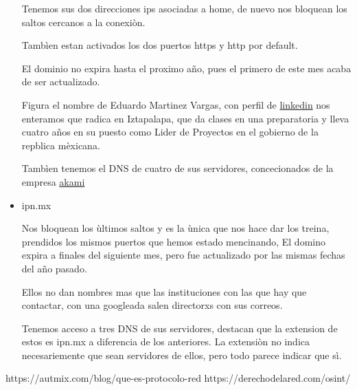 \documentclass{article}
\begin{document}
\begin{itemize}
  Tenemos sus dos direcciones ips asociadas a home, de nuevo nos bloquean los saltos cercanos
  a la conexiòn.

  Tambìen estan activados los dos puertos https y http por default.

  El dominio no expira hasta el proximo año, pues el primero de este mes acaba de ser actualizado.

  Figura el nombre de Eduardo Martinez Vargas, con perfil de
  \href{https://mx.linkedin.com/in/eduardomartinezv}{linkedin} nos enteramos que radica en
  Iztapalapa, que da clases en una preparatoria y lleva cuatro años en su puesto como
  Lider de Proyectos en el gobierno de la repblica mèxicana.

  Tambìen tenemos el DNS de cuatro de sus servidores, concecionados de la empresa
  \href{https://www.akamai.com/es}{akami}
  
\item ipn.mx
  
  Nos bloquean los ùltimos saltos y es la ùnica que nos hace dar los treina, prendidos los
  mismos puertos que hemos estado mencinando, El domino expira a finales del siguiente mes,
  pero fue actualizado por las mismas fechas del año pasado.

  Ellos no dan nombres mas que las instituciones con las que hay que contactar, con una googleada
  salen directorxs con sus correos.

  Tenemos acceso a tres DNS de sus servidores, destacan que la extension de estos es ipn.mx a diferencia
  de los anteriores. La extensiòn no indica necesariemente que sean servidores de ellos, pero todo
  parece indicar que sì. 
  
\end{itemize}

\begin{thebibliography}{2} %
\bibitem{} https://autmix.com/blog/que-es-protocolo-red
\bibitem{} https://derechodelared.com/osint/
\end{thebibliography}
\end{document}
